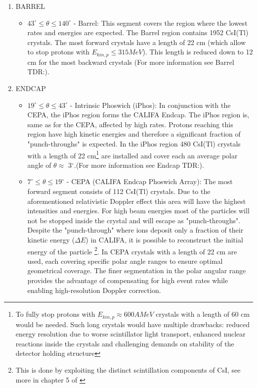 \begin{enumerate}
\item BARREL
\begin{itemize}
\item[\ding{108}] $43^{\circ} \leq \theta \leq 140^{\circ}$ - Barrel: This segment covers the region where the lowest rates and energies are expected. The Barrel region contains 1952 CsI(Tl) crystals. The most forward crystals have a length of 22 cm (which allow to stop protons with $E_{kin,p} \leq 315 MeV$). This length is reduced down to 12 cm for the most backward crystals (For more information see Barrel TDR:\cite{tdr:barrel}).   
\end{itemize}
\item ENDCAP
\begin{itemize}
\item[\ding{108}] $19^{\circ} \leq \theta \leq 43^{\circ}$ - Intrinsic Phoswich (iPhos): In conjunction with the CEPA, the iPhos region forms the CALIFA Endcap. The iPhos region is, same as for the CEPA, affected by high rates. Protons reaching this region have high kinetic energies and therefore a significant fraction of "punch-throughs" is expected. In the iPhos region 480 CsI(Tl) crystals with a length of 22 cm\footnote{To fully stop protons with $E_{kin,p} \approx 600 AMeV$ crystals with a length of 60 cm would be needed. Such long crystals would have multiple drawbacks: reduced energy resolution due to worse scintillator light transport, enhanced nuclear reactions inside the crystals and challenging demands on stability of the detector holding structure} are installed and cover each an average polar angle of $\theta \approx$ 3$^{\circ}$.(For more information see Endcap TDR:\cite{tdr:endcap}).
\item[\ding{108}] $7^{\circ} \leq \theta \leq 19^{\circ}$ - CEPA (CALIFA Endcap Phoswich Array): The most forward segment consists of 112 CsI(Tl) crystals. Due to the aforementioned relativistic Doppler effect this area will have the highest intensities and energies. For high beam energies most of the particles will not be stopped inside the crystal and will escape as "punch-throughs". Despite the "punch-through" where ions deposit only a fraction of their kinetic energy ($\Delta E$) in CALIFA, it is possible to reconstruct the initial energy of the particle \footnote{This is done by exploiting the distinct scintillation components of CsI, see more in chapter 5 of \cite{Bendel:98055}}. In CEPA crystals with a length of 22 cm are used, each covering specific polar angle ranges to ensure optimal geometrical coverage. The finer segmentation in the polar angular range provides the advantage of compensating for high event rates while enabling high-resolution Doppler correction.      
\end{itemize}


\end{enumerate}

